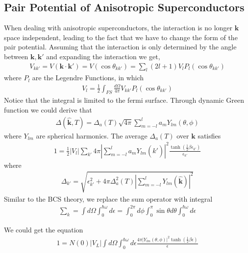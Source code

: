 \subsection{Pair Potential of Anisotropic Superconductors}
When dealing with anisotropic superconductors, the interaction is no longer $\mathbf{k}$ space independent, leading to the fact that we have to change the form of the pair potential.
Assuming that the interaction is only determined by the angle between $\mathbf{k,k'}$ and expanding the interaction we get,
\begin{eqnarray}
V_{kk'}=V(\mathbf{k}\cdot\mathbf{k'})=V(\cos\theta_{kk'})=\sum_l(2l+1)V_lP_l(\cos\theta_{kk'})
\end{eqnarray}
where $P_l$ are the Legendre Functions, in which
\begin{eqnarray}
V_l= \frac{1}{2}\int_{FS}\frac{d\Omega}{4\pi}V_{kk'}P_l(\cos\theta_{kk'})
\end{eqnarray}
Notice that the integral is limited to the fermi surface.
Through dynamic Green function we could derive that
\begin{eqnarray}\label{General Energy Gap}
\Delta(\widehat{\mathbf{k}},T) = \Delta_a(T)\sqrt{4\pi}\sum_{m=-l}^la_{m}Y_{lm}(\theta,\phi)
\end{eqnarray} 
where $Y_{lm}$ are spherical harmonics.
The average $\Delta_a(T)$ over $\mathbf{k}$ satisfies
\begin{eqnarray}
1=\frac{1}{2}|V_l|\sum_{k'}4\pi|\sum_{m=-l}^la_mY_{lm}(\widehat{k'})|^2\frac{\tanh(\frac{1}{2}\beta \epsilon_{k'})}{\epsilon_{k'}}
\end{eqnarray}
where 
\begin{eqnarray}
\Delta_{k'}=\sqrt{\epsilon_{k'}^2+4\pi\Delta_a^2(T)|\sum_{m=-l}^lY_{lm}(\widehat{\mathbf{k}})|^2}
\end{eqnarray}
Similar to the BCS theory, we replace the sum operator with integral
\begin{eqnarray}
\sum_k=\int d\Omega\int_0^{\hbar\omega} d\epsilon = \int_0^{2\pi}d\phi\int_0^{\pi} \sin\theta d \theta\int_0^{\hbar\omega}d\epsilon
\end{eqnarray}

We could get the equation
\begin{eqnarray}
1=N(0)|V_L|\int d\Omega	\int_0^{\hbar\omega}d\epsilon \frac{4\pi|Y_{lm}(\theta,\phi)|^2\tanh(\frac{1}{2}\beta \epsilon)}{\epsilon}
\end{eqnarray}

